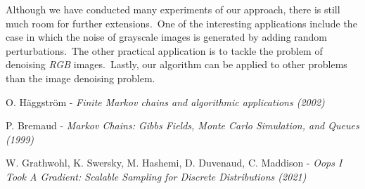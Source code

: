 \documentclass[a4paper, 11pt, onecolumn, openany, titlepage]{report}
\theoremstyle{default_theorem_style}\newtheorem{theorem}{Theorem}
\theoremstyle{default_theorem_style}\newtheorem{definition}{Definition}
\begin{document}
Although we have conducted many experiments of our approach, there is still much room for further extensions.\ One of
the interesting applications include the case in which the noise of grayscale images is generated by adding random
perturbations.\ The other practical application is to tackle the problem of denoising \textit{RGB} images.\ Lastly, our
algorithm can be applied to other problems than the image denoising problem.


\begin{thebibliography}{9}

O. Häggström - \textit{Finite Markov chains and algorithmic applications (2002)}

P. Bremaud - \textit{Markov Chains: Gibbs Fields, Monte Carlo Simulation, and Queues (1999)}

W. Grathwohl, K. Swersky, M. Hashemi, D. Duvenaud, C. Maddison -
\textit{Oops I Took A Gradient: Scalable Sampling for Discrete Distributions (2021)}

\end{thebibliography}
\end{document}

